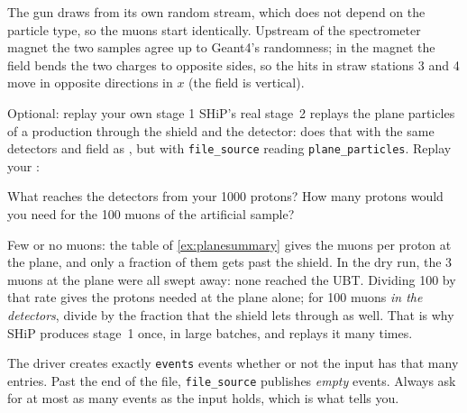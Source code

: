 \begin{solution}
The gun draws from its own random stream, which does not depend on the
particle type, so the muons start identically. Upstream of the spectrometer
magnet the two samples agree up to Geant4's randomness; in the magnet the
field bends the two charges to opposite sides, so the hits in straw
stations 3 and 4 move in opposite directions in $x$ (the field is vertical).
\end{solution}

\begin{exercise}[colback=white]{Optional: replay your own stage 1}
\label{ex:ownreplay}
SHiP's real stage~2 replays the plane particles of a production through the
shield and the detector:  does that
with the same detectors and field as , but with
\texttt{file\_source} reading \texttt{plane\_particles}. Replay your
:
What reaches the detectors from your 1000 protons? How many protons would
you need for the 100 muons of the artificial sample?
\end{exercise}

\begin{solution}
Few or no muons: the table of \cref{ex:planesummary} gives the muons per
proton at the plane, and only a fraction of them gets past the shield. In
the dry run, the 3 muons at the plane were all swept away: none reached the
UBT.
Dividing 100 by that rate gives the protons needed at the plane alone; for 100
muons \emph{in the detectors}, divide by the fraction that the shield lets
through as well. That is why SHiP produces stage~1 once, in large batches,
and replays it many times.
\end{solution}

\begin{pitfall}
The driver creates exactly \texttt{events} events whether or not the input has
that many entries. Past the end of the file, \texttt{file\_source} publishes
\emph{empty} events. Always ask for at most as many events as the input holds,
which is what \file{count\_entries.py} tells you.
\end{pitfall}
